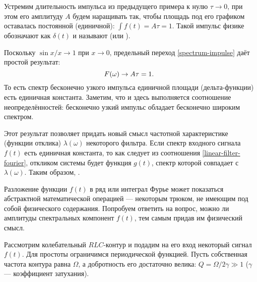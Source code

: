 \begin{lab:example}\label{example:delta}
Устремим длительность импульса из предыдущего примера к нулю $\tau\to 0$,
при этом его амплитуду $A$ будем наращивать так, чтобы площадь
под его графиком оставалась постоянной (единичной): $\int f(t) = A \tau = 1$.
Такой импульс физике обозначают как $\delta(t)$ и называют 
(или ).

Поскольку $\sin x/x\to 1$ при $x\to 0$,
предельный переход \eqref{spectrum-impulse} даёт простой результат:
\begin{equation}
    \eqmark{spectrum-delta}
    F(\omega)\to A\tau =1.
\end{equation}
То есть спектр бесконечно узкого импульса единичной площади (дельта-функции)
есть единичная константа. Заметим, что и здесь выполняется соотношение
неопределённостей: бесконечно узкий импульс 
обладает бесконечно широким спектром.

Этот результат позволяет придать новый смысл частотной характеристике
(функции отклика) $\lambda(\omega)$ некоторого фильтра.
Если спектр входного сигнала $f(t)$ есть единичная константа,
то как следует из соотношения \eqref{linear-filter-fourier},
откликом системы будет функция $g(t)$, спектр которой совпадает
с $\lambda(\omega)$. Таким образом, .
\end{lab:example}


\label{sec:spectrum-meaning}

Разложение функции $f(t)$ в ряд или интеграл Фурье может показаться
абстрактной математической операцией --- некоторым трюком, не имеющим
под собой физического содержания. Попробуем ответить на вопрос,
можно ли  амплитуды спектральных компонент $f(t)$,
тем самым придав им физический смысл.

Рассмотрим колебательный $RLC$-контур и подадим на его вход некоторый сигнал $f(t)$.
Для простоты ограничимся периодической функцией.
Пусть собственная частота контура равна $\Omega$, а добротность его
достаточно велика: $Q=\Omega/2\gamma \gg 1$ ($\gamma$ --- коэффициент затухания).

